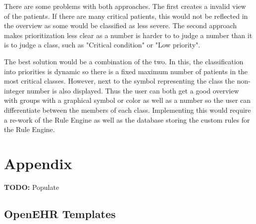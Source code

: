 \documentclass{article}
\begin{document}
There are some problems with both approaches. The first creates a invalid view of the patients. If there are many critical patients, this would not be reflected in the overview as some would be classified as less severe. The second approach makes prioritization less clear as a number is harder to to judge a number than it is to judge a class, such as "Critical condition" or "Low priority".

The best solution would be a combination of the two. In this, the classification into priorities is dynamic so there is a fixed maximum number of patients in the most critical classes. However, next to the symbol representing the class the non-integer number is also displayed. Thus the user can both get a good overview with groups with a graphical symbol or color as well as a number so the user can differentiate between the members of each class. Implementing this would require a re-work of the Rule Engine as well as the database storing the custom rules for the Rule Engine. 

\section{Appendix}
\textbf{TODO:} Populate
\subsection{OpenEHR Templates}
\end{document}
